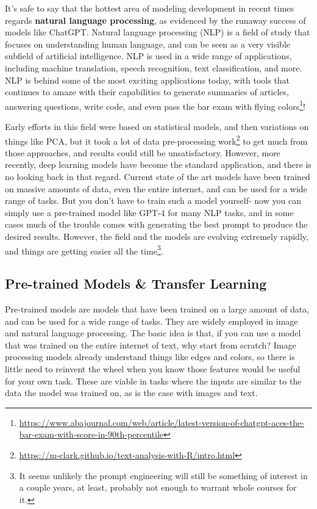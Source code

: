 \documentclass[
  letterpaper,
]{krantz}
\DeclareRobustCommand{\href}[2]{#2\footnote{\url{#1}}}
\begin{document}
It's safe to say that the hottest area of modeling development in recent
times regards \textbf{natural language processing}, as evidenced by the
runaway success of models like ChatGPT. Natural language processing
(NLP) is a field of study that focuses on understanding human language,
and can be seen as a very visible subfield of artificial intelligence.
NLP is used in a wide range of applications, including machine
translation, speech recognition, text classification, and more. NLP is
behind some of the most exciting applications today, with tools that
continues to amaze with their capabilities to generate summaries of
articles, answering questions, write code, and even
\href{https://www.abajournal.com/web/article/latest-version-of-chatgpt-aces-the-bar-exam-with-score-in-90th-percentile}{pass
the bar exam with flying colors}!

Early efforts in this field were based on statistical models, and then
variations on things like PCA, but it took a lot of
\href{https://m-clark.github.io/text-analysis-with-R/intro.html}{data
pre-processing work} to get much from those approaches, and results
could still be unsatisfactory. However, more recently, deep learning
models have become the standard application, and there is no looking
back in that regard. Current state of the art models have been trained
on massive amounts of data, even the entire internet, and can be used
for a wide range of tasks. But you don't have to train such a model
yourself- now you can simply use a pre-trained model like GPT-4 for many
NLP tasks, and in some cases much of the trouble comes with generating
the best prompt to produce the desired results. However, the field and
the models are evolving extremely rapidly, and things are getting easier
all the time\footnote{It seems unlikely the prompt engineering will
  still be something of interest in a couple years, at least, probably
  not enough to warrant whole courses for it.}.

\subsection{Pre-trained Models \& Transfer
Learning}\label{pre-trained-models-transfer-learning}

Pre-trained models are models that have been trained on a large amount
of data, and can be used for a wide range of tasks. They are widely
employed in image and natural language processing. The basic idea is
that, if you can use a model that was trained on the entire internet of
text, why start from scratch? Image processing models already understand
things like edges and colors, so there is little need to reinvent the
wheel when you know those features would be useful for your own task.
These are viable in tasks where the inputs are similar to the data the
model was trained on, as is the case with images and text.
\end{document}
